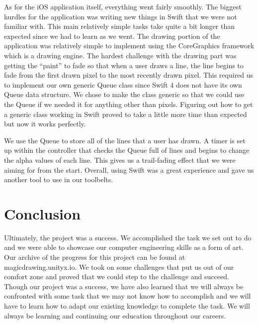 \documentclass[12pt]{article}
\begin{document}
As for the iOS application itself, everything went fairly smoothly. The biggest hurdles for the application was writing new things in Swift that we were not familiar with. This main relatively simple tasks take quite a bit longer than expected since we had to learn as we went. The drawing portion of the application was relatively simple to implement using the CoreGraphics framework which is a drawing engine. The hardest challenge with the drawing part was getting the “paint” to fade so that when a user draws a line, the line begins to fade from the first drawn pixel to the most recently drawn pixel. This required us to implement our own generic Queue class since Swift 4 does not have its own Queue data structure. We chose to make the class generic so that we could use the Queue if we needed it for anything other than pixels. Figuring out how to get a generic class working in Swift proved to take a little more time than expected but now it works perfectly.

We use the Queue to store all of the lines that a user has drawn. A timer is set up within the controller that checks the Queue full of lines and begins to change the alpha values of each line. This gives us a trail-fading effect that we were aiming for from the start. Overall, using Swift was a great experience and gave us another tool to use in our toolbelts.

\section{Conclusion}
Ultimately, the project was a success. We accomplished the task we set out to do and we were able to showcase our computer engineering skills as a form of art. Our archive of the progress for this project can be found at magicdrawing.unityx.io. We took on some challenges that put us out of our comfort zone and proved that we could step to the challenge and succeed. Though our project was a success, we have also learned that we will always be confronted with some task that we may not know how to accomplish and we will have to learn how to adapt our existing knowledge to complete the task. We will always be learning and continuing our education throughout our careers.

\newpage
\end{document}
